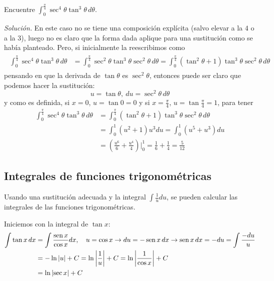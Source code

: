 \begin{ejemplo}
  Encuentre $\int_{0}^{\frac{\pi }{4}}\sec ^{4}\theta \tan ^{3}\theta\,d\theta$.
\end{ejemplo}

\emph{Solución.} En este caso no se tiene una composición explícita (salvo elevar a la $4$ o a la $3$), luego no es claro que la forma dada aplique para una sustitución como se había planteado. Pero, si inicialmente la reescribimos como
\begin{gather*}
  \begin{aligned}
    \int_{0}^{\frac{\pi }{4}}\sec ^{4}\theta \tan ^{3}\theta\,d\theta&=\int_{0}^{\frac{\pi }{4}}\sec ^{2}\theta \tan ^{3}\theta \sec ^{2}\theta\,d\theta =\int_{0}^{\frac{\pi }{4}}\left( \tan ^{2}\theta +1\right) \tan ^{3}\theta
    \sec ^{2}\theta\,d\theta
  \end{aligned}
\end{gather*}
pensando en que la derivada de $\tan \theta$ es $\sec^2\theta$, entonces puede ser claro que podemos hacer la sustitución:
\[
  u=\tan \theta, \ du=\sec ^{2}\theta\,d\theta
\]
y como es definida, si $x=0$, $u=\tan 0=0$ y si $x=\frac{\pi }{4}$, $u=\tan
\frac{\pi }{4}=1$, para tener
\begin{align*}
  \int_{0}^{\frac{\pi }{4}}\sec ^{4}\theta \tan ^{3}\theta\,d\theta&=\int_{0}^{\frac{\pi }{4}}\left( \tan ^{2}\theta +1\right) \tan ^{3}\theta\sec ^{2}\theta\,d\theta \\
  &=\int_{0}^{1}\left( u^{2}+1\right) u^{3}du=\int_{0}^{1}\left(u^{5}+u^{3}\right) du \\
  &=\left(\frac{u^{6}}{6}+\frac{u^{4}}{4}\right)\Big\vert_{0}^{1} =\frac{1}{6}+\frac{1}{4}=\frac{5}{12}
\end{align*}

\subsection{Integrales de funciones trigonométricas}

Usando una sustitución adecuada y la integral $\int \frac{1}{u}du$, se pueden calcular las integrales de las funciones trigonométricas.

Iniciemos con la integral de $\tan x$:
\begin{gather*}
  \begin{aligned}
    \int \tan x\,dx&=\int \frac{\operatorname{sen} x}{\cos x}dx,\quad u=\cos x \rightarrow du=-\operatorname{sen} x\,dx\rightarrow \operatorname{sen} x\,dx=-du=\int \frac{-du}{u}\\
    &=-\ln \left\vert u\right\vert+C =\ln \left\vert \frac{1}{u}\right\vert+C=\ln \left\vert \frac{1}{\cos x}\right\vert+C\\
    & =\ln \left\vert \sec
    x\right\vert +C
  \end{aligned}
\end{gather*}

